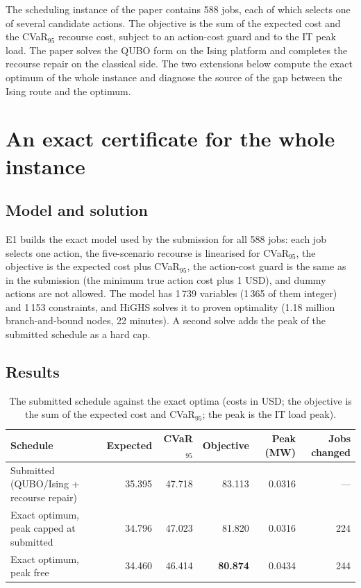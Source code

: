The scheduling instance of the paper contains 588 jobs, each of which selects one of several candidate actions. The objective is the sum of the expected cost and the CVaR$_{95}$\cite{rockafellar2000} recourse cost, subject to an action-cost guard and to the IT peak load. The paper solves the QUBO form\cite{lucas2014} on the Ising platform and completes the recourse repair on the classical side. The two extensions below compute the exact optimum of the whole instance and diagnose the source of the gap between the Ising route and the optimum.

\section{An exact certificate for the whole instance}

\subsection{Model and solution}
E1 builds the exact model used by the submission for all 588 jobs: each job selects one action, the five-scenario recourse is linearised for CVaR$_{95}$, the objective is the expected cost plus CVaR$_{95}$, the action-cost guard is the same as in the submission (the minimum true action cost plus 1 USD), and dummy actions are not allowed. The model has 1\,739 variables (1\,365 of them integer) and 1\,153 constraints, and HiGHS\cite{huangfu2018} solves it to proven optimality (1.18 million branch-and-bound nodes, 22 minutes). A second solve adds the peak of the submitted schedule as a hard cap.

\subsection{Results}
\begin{table}[htbp]\centering\small\setlength{\tabcolsep}{5pt}
\caption{The submitted schedule against the exact optima (costs in USD; the objective is the sum of the expected cost and CVaR$_{95}$; the peak is the IT load peak).}\label{tab:is-e1}
\begin{tabular}{lrrrrr}\toprule
Schedule & Expected & CVaR$_{95}$ & Objective & Peak (MW) & Jobs changed\\\midrule
Submitted (QUBO/Ising + recourse repair) & 35.395 & 47.718 & 83.113 & 0.0316 & ---\\
Exact optimum, peak capped at submitted & 34.796 & 47.023 & 81.820 & 0.0316 & 224\\
Exact optimum, peak free & 34.460 & 46.414 & \textbf{80.874} & 0.0434 & 244\\\bottomrule
\end{tabular}
\end{table}

